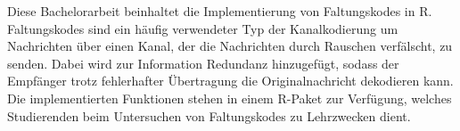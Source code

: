 Diese Bachelorarbeit beinhaltet die Implementierung von Faltungskodes in R. Faltungskodes sind ein häufig verwendeter Typ der Kanalkodierung um Nachrichten über einen Kanal, der die Nachrichten durch Rauschen verfälscht, zu senden. Dabei wird zur Information Redundanz hinzugefügt, sodass der Empfänger trotz fehlerhafter Übertragung die Originalnachricht dekodieren kann. Die implementierten Funktionen stehen in einem R-Paket zur Verfügung, welches Studierenden beim Untersuchen von Faltungskodes zu Lehrzwecken dient.
